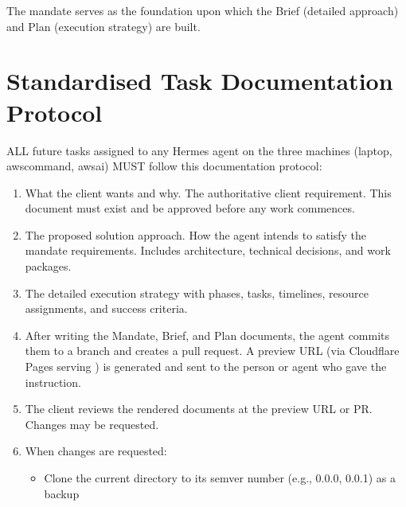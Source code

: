 \documentclass[letterpaper,10pt,openany,oneside,english]{sphinxmanual}
\begin{document}
\sphinxAtStartPar
The mandate serves as the foundation upon which the Brief (detailed
approach) and Plan (execution strategy) are built.


\section{Standardised Task Documentation Protocol}
\label{\detokenize{purpose:standardised-task-documentation-protocol}}
\sphinxAtStartPar
ALL future tasks assigned to any Hermes agent on the three machines
(laptop, aws\sphinxhyphen{}command, aws\sphinxhyphen{}ai) MUST follow this documentation protocol:
\begin{enumerate}
%
\item {} 
\sphinxAtStartPar
{} \sphinxhyphen{} What the client wants and why. The authoritative client
requirement. This document must exist and be approved before any work
commences.

\item {} 
\sphinxAtStartPar
{} \sphinxhyphen{} The proposed solution approach. How the agent intends to
satisfy the mandate requirements. Includes architecture, technical
decisions, and work packages.

\item {} 
\sphinxAtStartPar
{} \sphinxhyphen{} The detailed execution strategy with phases, tasks,
timelines, resource assignments, and success criteria.

\item {} 
\sphinxAtStartPar
{} \sphinxhyphen{} After writing the Mandate, Brief, and Plan documents,
the agent commits them to a branch and creates a pull request. A preview
URL (via Cloudflare Pages serving ) is generated
and sent to the person or agent who gave the instruction.

\item {} 
\sphinxAtStartPar
{} \sphinxhyphen{} The client reviews the rendered documents at the
preview URL or PR. Changes may be requested.

\item {} 
\sphinxAtStartPar
{} \sphinxhyphen{} When changes are requested:
\begin{itemize}
\item {} 
\sphinxAtStartPar
Clone the current  directory to its semver number
(e.g., 0.0.0, 0.0.1) as a backup


\end{itemize}
\end{enumerate}
\end{document}
